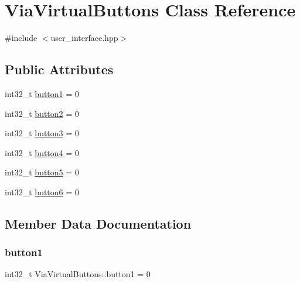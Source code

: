 \hypertarget{class_via_virtual_buttons}{}\section{Via\+Virtual\+Buttons Class Reference}
\label{class_via_virtual_buttons}


{\ttfamily \#include $<$user\+\_\+interface.\+hpp$>$}

\subsection*{Public Attributes}
\begin{DoxyCompactItemize}
\item 
int32\+\_\+t \mbox{\hyperlink{class_via_virtual_buttons_a63f54e21435cb28bd1f76a5f17127733}{button1}} = 0
\item 
int32\+\_\+t \mbox{\hyperlink{class_via_virtual_buttons_a2d0ba0365e6125a5e99f42758850dd80}{button2}} = 0
\item 
int32\+\_\+t \mbox{\hyperlink{class_via_virtual_buttons_a526cd43cac8ceaeb1e183fe86c79aee5}{button3}} = 0
\item 
int32\+\_\+t \mbox{\hyperlink{class_via_virtual_buttons_ab0810274e864ed2f935bd98862d1ac8a}{button4}} = 0
\item 
int32\+\_\+t \mbox{\hyperlink{class_via_virtual_buttons_af7f5c6d0c7335c3445b3fab91d42a888}{button5}} = 0
\item 
int32\+\_\+t \mbox{\hyperlink{class_via_virtual_buttons_abbd05f315a3ed3399daf55fd88d100f5}{button6}} = 0
\end{DoxyCompactItemize}


\subsection{Member Data Documentation}
\mbox{\label{class_via_virtual_buttons_a63f54e21435cb28bd1f76a5f17127733}} 
\subsubsection{\texorpdfstring{button1}{button1}}
{\footnotesize\ttfamily int32\+\_\+t Via\+Virtual\+Buttons\+::button1 = 0}

\mbox{\label{class_via_virtual_buttons_a2d0ba0365e6125a5e99f42758850dd80}} 
